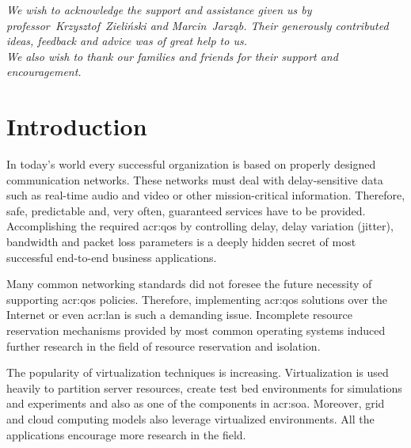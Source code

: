 \documentclass[11pt,openany]{book}
\newlength{\myheadrulewidth}
\renewcommand{\headrulewidth}{0pt}
\begin{document}
	\begin{center}
    \textit{We wish to acknowledge the support and assistance given us by professor~Krzysztof~Zieliński and
            Marcin~Jarząb. Their generously contributed ideas, feedback and advice was of great help to us. \\
            We also wish to thank our families and friends for their support and encouragement.}
  \end{center}

	\vspace*{\fill}

  \tableofcontents

  \listoffigures

  \newpage

  \pagestyle{fancy}
  \lhead{\leftmark}
  \rhead{\thepage}
  \cfoot{}
  \renewcommand{\headrulewidth}{\myheadrulewidth}


  \chapter{Introduction}
  \label{chap:intro}


    In today's world every successful organization is based on properly designed communication networks. These networks
    must deal with delay-sensitive data such as real-time audio and video or other mission-critical information.
    Therefore, safe, predictable and, very often, guaranteed services have to be provided. Accomplishing the required
    \gls{acr:qos} by controlling delay, delay variation (jitter), bandwidth and packet loss parameters is a deeply
    hidden secret of most successful end-to-end business applications.
    
    Many common networking standards did not foresee the future necessity of supporting \gls{acr:qos} policies.
    Therefore, implementing \gls{acr:qos} solutions over the Internet or even \gls{acr:lan} is such a demanding issue.
    Incomplete resource reservation mechanisms provided by most common operating systems induced further research in the
    field of resource reservation and isolation. 

    The popularity of virtualization techniques is increasing. Virtualization is used heavily to partition server
    resources, create test bed environments for simulations and experiments and also as one of the components in
    \gls{acr:soa}. Moreover, grid and cloud computing models also leverage virtualized environments. All the
    applications encourage more research in the field.
\end{document}
